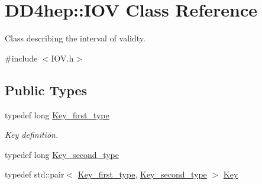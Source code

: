 \hypertarget{class_d_d4hep_1_1_i_o_v}{
\section{DD4hep::IOV Class Reference}
\label{class_d_d4hep_1_1_i_o_v}
}


Class describing the interval of validty.  


{\ttfamily \#include $<$IOV.h$>$}\subsection*{Public Types}
\begin{DoxyCompactItemize}
\item 
typedef long \hyperlink{class_d_d4hep_1_1_i_o_v_a3f518f6b507c82c4ee614e52b3519325}{Key\_\-first\_\-type}
\begin{DoxyCompactList}\small\item\em Key definition. \item\end{DoxyCompactList}\item 
typedef long \hyperlink{class_d_d4hep_1_1_i_o_v_ae1e4d1584dcc17a416008a93d94376b5}{Key\_\-second\_\-type}
\item 
typedef std::pair$<$ \hyperlink{class_d_d4hep_1_1_i_o_v_a3f518f6b507c82c4ee614e52b3519325}{Key\_\-first\_\-type}, \hyperlink{class_d_d4hep_1_1_i_o_v_ae1e4d1584dcc17a416008a93d94376b5}{Key\_\-second\_\-type} $>$ \hyperlink{class_d_d4hep_1_1_i_o_v_a07cb46dc875296dc9cccf4ff370104ae}{Key}
\end{DoxyCompactItemize}
